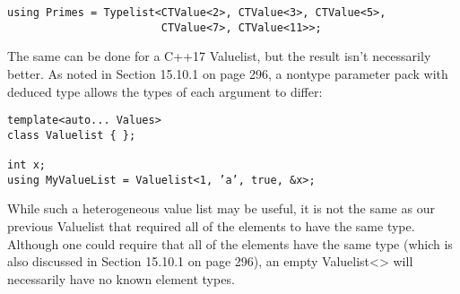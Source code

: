 \begin{lstlisting}[style=styleCXX]
using Primes = Typelist<CTValue<2>, CTValue<3>, CTValue<5>,
						CTValue<7>, CTValue<11>>;
\end{lstlisting}

The same can be done for a C++17 Valuelist, but the result isn’t necessarily better. As noted in Section 15.10.1 on page 296, a nontype parameter pack with deduced type allows the types of each argument to differ:

\begin{lstlisting}[style=styleCXX]
template<auto... Values>
class Valuelist { };

int x;
using MyValueList = Valuelist<1, ’a’, true, &x>;
\end{lstlisting}

While such a heterogeneous value list may be useful, it is not the same as our previous Valuelist that required all of the elements to have the same type. Although one could require that all of the elements have the same type (which is also discussed in Section 15.10.1 on page 296), an empty Valuelist<> will necessarily have no known element types.













